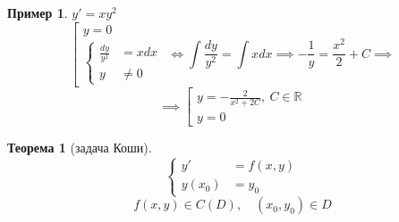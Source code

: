 \documentclass[11pt,a4paper,oneside]{report}
\theoremstyle{definition}
\newtheorem{example}{Пример}
\theoremstyle{plain}
\newtheorem{theorem}{Теорема}[section]
\theoremstyle{remark}
\begin{document}
\begin{example}
    $y' = xy^2$
    \begin{equation*}
        \left[\begin{array}{l}
            y = 0 \\
            \left\{\begin{array}{rl}
                       \frac{dy}{y^2} & = xdx \\
                       y              & \ne 0
                   \end{array}\right.
        \end{array}\right. \iff \int \frac{dy}{y^2} = \int xdx \implies -\frac{1}{y} = \frac{x^2}{2} + C \implies
    \end{equation*}
    \begin{equation*}
        \implies\left[\begin{array}{l}
            y = -\frac{2}{x^2 + 2C}, \ C \in \mathbb{R} \\
            y = 0
        \end{array}\right.
    \end{equation*}
\end{example}

\begin{theorem}[задача Коши]
    \begin{equation}\label{eq5}
        \left\{\begin{array}{rl}
            y'     & =f(x,y) \\
            y(x_0) & = y_0
        \end{array}\right.
    \end{equation}
    \begin{equation*}
        f(x,y) \in C(D), \quad (x_0, y_0) \in D
    \end{equation*}
\end{theorem}
\end{document}
